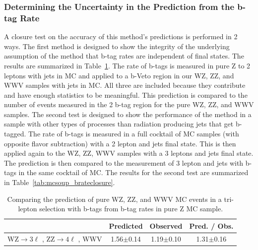         		\subsubsection{Determining the Uncertainty in the Prediction from the b-tag Rate}
		A closure test on the accuracy of this method's predictions is performed in 2 ways. The first method is designed to show the integrity of the underlying assumption of the method that b-tag rates are independent of final states. The results are summarized in Table~\ref{tab:wz_z_brateclosure}. The rate of b-tags is measured in pure Z to 2 leptons with jets in MC and applied to a b-Veto region in our WZ, ZZ, and WWV samples with jets in MC. All three are included because they contribute and have enough statistics to be meaningful. This prediction is compared to the number of events measured in the 2 b-tag region for the pure WZ, ZZ, and WWV samples. The second test is designed to show the performance of the method in a sample with other types of processes than radiation producing jets that get b-tagged. The rate of b-tags is measured in a full cocktail of MC samples (with opposite flavor subtraction) with a 2 lepton and jets final state. This is then applied again to the WZ, ZZ, WWV samples with a 3 leptons and jets final state. The prediction is then compared to the measurement of 3 lepton and jets with b-tags in the same cocktail of MC. The results for the second test are summarized in Table~\ref{tab:mcsoup_brateclosure}.\\

\begin{table}[ht!]
\begin{center}
\caption{\small \label{tab:wz_z_brateclosure} Comparing the prediction of pure WZ, ZZ, and WWV MC events in a tri-lepton selection with b-tags from b-tag rates in pure Z MC sample.}
\begin{tabular}{c|ccc}\hline
                                                                                               & Predicted            & Observed          & Pred. / Obs.\\
\hline \hline
WZ$\rightarrow 3\ell $ , ZZ$\rightarrow 4\ell$ , WWV  &  1.56$\pm$0.14 & 1.19$\pm$0.10 & 1.31$\pm$0.16\\		
\hline
\end{tabular}
\end{center}
\end{table}


